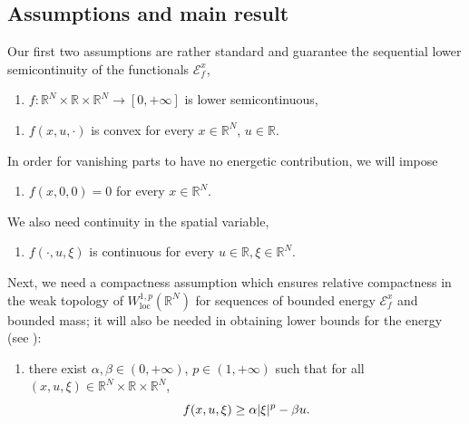 \documentclass[10pt]{amsart}
\theoremstyle{plain}
\theoremstyle{definition}
\newcommand{\R}{\mathbb{R}}
\newcommand{\ener}{\mathcal{E}}
\newcommand{\loc}{\mathrm{loc}}
\DeclarePairedDelimiter{\abs}{\lvert}{\rvert}
\begin{document}
\subsection{Assumptions and main result}

Our first two assumptions are rather standard and guarantee the sequential lower semicontinuity of the functionals \(\ener_f^x\),

\begin{enumerate}[\textnormal{(H}$_1$\textnormal{)},leftmargin=1.5\normalparindent]
\item\label{hypLowerContinuous} \(f : \R^N\times\R\times\R^N \to [0,+\infty]\) is lower semicontinuous,
\end{enumerate}

\begin{enumerate}[\textnormal{(H}$_1$\textnormal{)},leftmargin=1.5\normalparindent,resume]
\item\label{hypConvex} $f(x,u,\cdot)$ is convex for every $x\in \R^N$, $u\in\R$.\end{enumerate}

In order for vanishing parts to have no energetic contribution, we will impose
\begin{enumerate}[\textnormal{(H}$_1$\textnormal{)},leftmargin=1.5\normalparindent,resume]
\item\label{hypZero} $f(x,0,0)=0$ for every $x\in \R^N$.
\end{enumerate}

We also need continuity in the spatial variable,
\begin{enumerate}[\textnormal{(H}$_1$\textnormal{)},leftmargin=1.5\normalparindent,resume]
\item\label{hypContinuous} $f(\cdot,u,\xi)$ is continuous for every $u\in\R,\xi\in \R^N$.
\end{enumerate}

Next, we need a compactness assumption which ensures relative compactness in the weak topology of \(W^{1,p}_\loc(\R^N)\) for sequences of bounded energy \(\ener_f^x\) and bounded mass; it will also be needed in obtaining lower bounds for the energy (see ):
\begin{enumerate}[\textnormal{(H}$_1$\textnormal{)},leftmargin=1.5\normalparindent,resume]
\item\label{hypCompact} there exist \(\alpha,\beta\!\in\!(0,+\infty)\), \(p\!\in\! (1,+\infty)\) such that for all $(x,u,\xi)\!\in\! \R^N \!\times\!\R\!\times\!\R^N$,
\[f(x,u,\xi) \geq \alpha\abs{\xi}^p-\beta u.\]
\end{enumerate}
\end{document}
